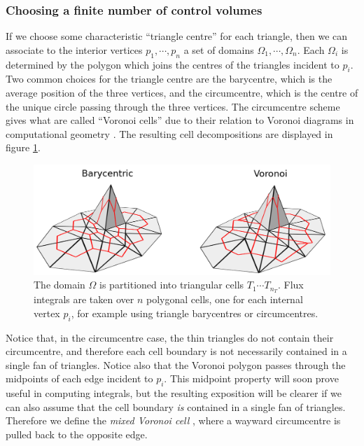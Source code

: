 \subsubsection{Choosing a finite number of control volumes}
If we choose some characteristic ``triangle centre'' for each triangle, then we can associate to the interior vertices
$p_1,\cdots,p_n$ a set of domains $\Omega_1,\cdots,\Omega_n$. Each $\Omega_i$ is determined by the polygon which joins the centres of the triangles
incident to $p_i$.
Two common choices for the triangle centre are the barycentre, which is the average position of the three vertices, and the circumcentre,
which is the centre of the unique circle passing through the three vertices. The circumcentre scheme gives what are called
``Voronoi cells'' due to their relation to Voronoi diagrams in computational geometry \cite{orourke}.
The resulting cell decompositions are displayed in figure
\ref{cell_decompositions}.

\begin{figure}[H]
    \begin{center}
        \includegraphics[width=0.7\linewidth]{figures/cell.png}
    \end{center}
    \caption{\scriptsize
        The domain $\Omega$ is partitioned into triangular cells $T_1\cdots T_{n_T}$.
        Flux integrals are taken over $n$ polygonal cells, one for each internal vertex $p_i$, for example using triangle barycentres or circumcentres.
    }
    \label{cell_decompositions}
\end{figure}
Notice that, in the circumcentre case, the thin triangles do not contain their circumcentre, and therefore each cell boundary is not necessarily
contained in a single fan of triangles. Notice also that the Voronoi polygon passes through the midpoints of each edge incident to $p_i$.
This midpoint property will soon prove useful in computing integrals, but the resulting exposition will be clearer if we can also
assume that the cell boundary \textit{is} contained in a single fan of triangles. Therefore we define the \textit{mixed Voronoi cell} \cite{polygon_mesh_processing},
where a wayward circumcentre is pulled back to the opposite edge.

